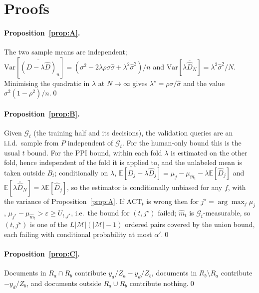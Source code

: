 \documentclass{article}
\newcommand{\eps}{\varepsilon}
\newcommand{\ACT}{\mathrm{ACT}}
\begin{document}
\section{Proofs}\label{app:proofs}
\paragraph{Proposition~\ref{prop:A}.} The two sample means are independent; $\mathrm{Var}[\overline{(D-\lambda\hat D)}_n]=(\sigma^2-2\lambda\rho\sigma\hat\sigma+\lambda^2\hat\sigma^2)/n$ and $\mathrm{Var}[\lambda\overline{\hat D}_N]=\lambda^2\hat\sigma^2/N$. Minimising the quadratic in $\lambda$ at $N\to\infty$ gives $\lambda^\star=\rho\sigma/\hat\sigma$ and the value $\sigma^2(1-\rho^2)/n$.\qed
\paragraph{Proposition~\ref{prop:B}.} Given $\mathcal G_t$ (the training half and its decisions), the validation queries are an i.i.d.\ sample from $P$ independent of $\mathcal G_t$. For the human-only bound this is the usual $t$ bound. For the PPI bound, within each fold $\lambda$ is estimated on the other fold, hence independent of the fold it is applied to, and the unlabeled mean is taken outside $B_t$; conditionally on $\lambda$, $\mathbb E[D_j-\lambda\hat D_j]=\mu_j-\mu_{\hat m_t}-\lambda\mathbb E[\hat D_j]$ and $\mathbb E[\lambda\overline{\hat D}_N]=\lambda\mathbb E[\hat D_j]$, so the estimator is conditionally unbiased for any $f$, with the variance of Proposition~\ref{prop:A}. If $\ACT_t$ is wrong then for $j^\star=\arg\max_j\mu_j$, $\mu_{j^\star}-\mu_{\hat m_t}>\eps\ge U_{t,j^\star}$, i.e.\ the bound for $(t,j^\star)$ failed; $\hat m_t$ is $\mathcal G_t$-measurable, so $(t,j^\star)$ is one of the $L|\mathcal M|(|\mathcal M|-1)$ ordered pairs covered by the union bound, each failing with conditional probability at most $\alpha'$.\qed
\paragraph{Proposition~\ref{prop:C}.} Documents in $R_a\cap R_b$ contribute $y_d/Z_a-y_d/Z_b$, documents in $R_b\setminus R_a$ contribute $-y_d/Z_b$, and documents outside $R_a\cup R_b$ contribute nothing.\qed
\end{document}
